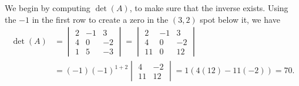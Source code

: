 {
We begin by computing $\det(A)$, to make sure that the inverse exists. Using the $-1$ in the first row to create a zero in the $(3,2)$ spot below it, we have
\begin{align*}
\det(A) & = \begin{vmatrix}
2 & -1 & 3\\ 4 & 0 & -2\\ 1 & 5 & -3
\end{vmatrix} = \begin{vmatrix}
2 & -1 & 3\\ 4 & 0 & -2\\ 11 & 0 & 12
\end{vmatrix}\\
& = (-1)(-1)^{1+2}\begin{vmatrix}
4 & -2\\ 11 & 12
\end{vmatrix} = 1(4(12)-11(-2)) = 70.
\end{align*}


}
